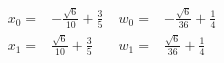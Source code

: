 \begin{problem}

\end{problem}


\begin{solution}
  \begin{align}
     x_0 = &- \frac{\sqrt{6}}{10} + \frac{3}{5} \; & 
    w_0 = &- \frac{\sqrt{6}}{36} + \frac{1}{4}  \\
    \nonumber
    x_1 = &\frac{\sqrt{6}}{10} + \frac{3}{5} \; &
    w_1 = & \frac{\sqrt{6}}{36} + \frac{1}{4}
  \end{align}
\end{solution}


